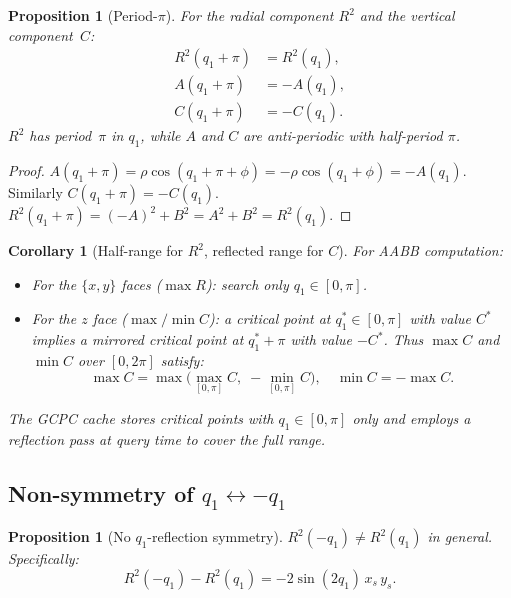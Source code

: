 \documentclass[11pt,a4paper]{article}
\newtheorem{proposition}[theorem]{Proposition}
\newtheorem{corollary}[theorem]{Corollary}
\begin{document}
\begin{proposition}[Period-$\pi$]\label{prop:period_pi}
For the radial component $R^2$ and the vertical component~$C$:
\begin{align}
  R^2(q_1 + \pi) &= R^2(q_1), \label{eq:R2_period}\\
  A(q_1 + \pi) &= -A(q_1), \label{eq:A_negate}\\
  C(q_1 + \pi) &= -C(q_1). \label{eq:C_negate}
\end{align}
$R^2$ has period~$\pi$ in $q_1$, while $A$ and $C$ are
\emph{anti-periodic} with half-period $\pi$.
\end{proposition}

\begin{proof}
$A(q_1+\pi) = \rho\cos(q_1+\pi+\phi) = -\rho\cos(q_1+\phi) = -A(q_1)$.
Similarly $C(q_1+\pi) = -C(q_1)$.
$R^2(q_1+\pi) = (-A)^2 + B^2 = A^2 + B^2 = R^2(q_1)$.
\end{proof}

\begin{corollary}[Half-range for $R^2$, reflected range for $C$]\label{cor:half_range}
For AABB computation:
\begin{itemize}
  \item For the $\{x,y\}$ faces ($\max R$): search only $q_1 \in [0,\pi]$.
  \item For the $z$ face ($\max/\min C$): a critical point at
        $q_1^* \in [0,\pi]$ with value $C^*$ implies a mirrored
        critical point at $q_1^*+\pi$ with value $-C^*$.
        Thus $\max C$ and $\min C$ over $[0,2\pi]$ satisfy:
        \[
          \max C = \max\bigl(\max_{[0,\pi]} C,\;
            -\min_{[0,\pi]} C\bigr),
          \quad
          \min C = -\max C.
        \]
\end{itemize}
The GCPC cache stores critical points with $q_1 \in [0,\pi]$ only and
employs a \emph{reflection pass} at query time to cover the full range.
\end{corollary}


\subsection{Non-symmetry of $q_1 \leftrightarrow -q_1$}\label{sec:q1_nonsym}

\begin{proposition}[No $q_1$-reflection symmetry]\label{prop:no_negation}
$R^2(-q_1) \ne R^2(q_1)$ in general. Specifically:
\begin{equation}\label{eq:R2_diff}
  R^2(-q_1) - R^2(q_1) = -2\sin(2q_1)\,x_s\,y_s.
\end{equation}
\end{proposition}
\end{document}
